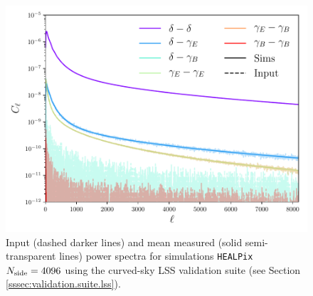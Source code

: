 \documentclass[usenatbib]{mnrasb}
\begin{document}
    \begin{figure}
      \centering
      \includegraphics[width=0.99\columnwidth]{val_cl_lss_sph_4096}
      \caption{Input (dashed darker lines) and mean measured (solid semi-transparent lines) power spectra for simulations \texttt{HEALPix} $N_{\rm side}=4096$ using the curved-sky LSS validation suite (see Section \ref{sssec:validation.suite.lss}).}
      \label{fig:validation.fullsky.lss.4096}
    \end{figure}
    
\bsp
\end{document}
